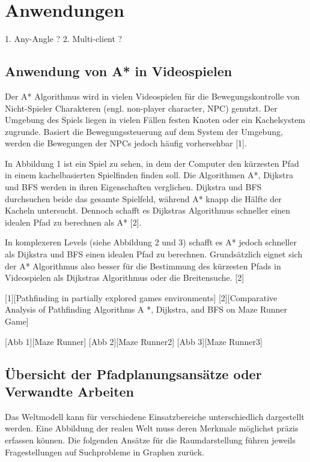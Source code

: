 \chapter{Anwendungen}

1. Any-Angle ?
2. Multi-client ?

\section{Anwendung von A* in Videospielen}

Der A* Algorithmus wird in vielen Videospielen für die Bewegungskontrolle von Nicht-Spieler Charakteren (engl. non-player character, NPC) genutzt. Der Umgebung des Spiels liegen in vielen Fällen festen Knoten oder ein Kachelsystem zugrunde. Basiert die Bewegungssteuerung auf dem System der Umgebung, werden die Bewegungen der NPCs jedoch häufig vorhersehbar [1].

In Abbildung 1 ist ein Spiel zu sehen, in dem der Computer den kürzesten Pfad in einem kachelbasierten Spielfinden finden soll. Die Algorithmen A*, Dijkstra und BFS werden in ihren Eigenschaften verglichen. Dijkstra und BFS durchsuchen beide das gesamte Spielfeld, während A* knapp die Hälfte der Kacheln untersucht. Dennoch schafft es Dijkstras Algorithmus schneller einen idealen Pfad zu berechnen als A* [2].

In komplexeren Levels (siehe Abbildung 2 und 3) schafft es A* jedoch schneller als Dijkstra und BFS einen idealen Pfad zu berechnen. Grundsätzlich eignet sich der A* Algorithmus also besser für die Bestimmung des kürzesten Pfads in Videospielen als Dijkstras Algorithmus oder die Breitensuche. [2]

[1][Pathfinding in partially explored games environments]
[2][Comparative Analysis of Pathfinding Algorithms A *, Dijkstra, and BFS on Maze Runner Game]

[Abb 1][Maze Runner]
[Abb 2][Maze Runner2]
[Abb 3][Maze Runner3]




\section{Übersicht der Pfadplanungsansätze oder Verwandte Arbeiten} %

Das Weltmodell kann für verschiedene Einsatzbereiche unterschiedlich dargestellt werden. Eine Abbildung der realen Welt muss deren Merkmale möglichst präzis erfassen können. Die folgenden Ansätze für die Raumdarstellung führen jeweils Fragestellungen auf Suchprobleme in Graphen zurück. %

